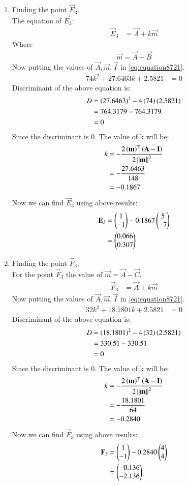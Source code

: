 \documentclass[journal,12pt,twocolumn]{IEEEtran}
\theoremstyle{remark}
\begin{document}
\begin{enumerate}
\item Finding the point $\vec{E}_3$.\\
The equation of $\vec{E}_3$:
\begin{align}
\vec{E}_3 &=\vec{A}+k\vec{m}
\end{align}
Where 
\begin{align}
\vec{m} = \vec{A}-\vec{B}
\end{align}
Now putting the values of $\vec{A}, \vec{m}, \vec{I}$ in \eqref{eq:equation8721}.
\begin{align}
74k^2+27.6463k+2.5821 &= 0
\end{align}
Discriminant of the above equation is:
\begin{align}
D &= \left(27.6463\right)^2-4\left(74\right)\left(2.5821\right)\\
&= 764.3179-764.3179\\
&= 0
\end{align}
Since the discriminant is $0$. The value of k will be:
\begin{align}
k &= -\frac{2\left(\mathbf{m}\right)^\top\left(\mathbf{A-I}\right)}{2\left\lVert\mathbf{m}\right\rVert^2} \\
&= -\frac{27.6463}{148} \\
&= -0.1867
\end{align}
Now we can find $\vec{E}_3$ using above results:
\begin{align}
\mathbf{E}_3 &=\begin{pmatrix}1\\-1\end{pmatrix}-0.1867\begin{pmatrix}5\\-7\end{pmatrix} \\
&=\begin{pmatrix}0.066\\0.307\end{pmatrix}
\end{align}
\item Finding the point $\vec{F}_3$.\\
For the point $\vec{F}_3$ the value of $\vec{m} = \vec{A}-\vec{C}$. 
\begin{align}
\vec{F}_3 &=\vec{A}+k\vec{m}
\end{align}
Now putting the values of $\vec{A}, \vec{m}, \vec{I}$ in \eqref{eq:equation8721}.
\begin{align}
32k^2+18.1801k+2.5821 &= 0
\end{align}
Discriminant of the above equation is:
\begin{align}
D &= \left(18.1801\right)^2-4\left(32\right)\left(2.5821\right)\\
&= 330.51-330.51\\
&= 0
\end{align}
Since the discriminant is $0$. The value of k will be:
\begin{align}
k &= -\frac{2\left(\mathbf{m}\right)^\top\left(\mathbf{A-I}\right)}{2\left\lVert\mathbf{m}\right\rVert^2}\\
&= -\frac{18.1801}{64}\\
&= -0.2840
\end{align}
Now we can find $\vec{F}_3$ using above results:
\begin{align}
\mathbf{F}_3 &=\begin{pmatrix}1\\-1\end{pmatrix}-0.2840\begin{pmatrix}4\\4\end{pmatrix}\\
&= \begin{pmatrix}-0.136\\-2.136\end{pmatrix}
\end{align}
\end{enumerate}
\end{document}
